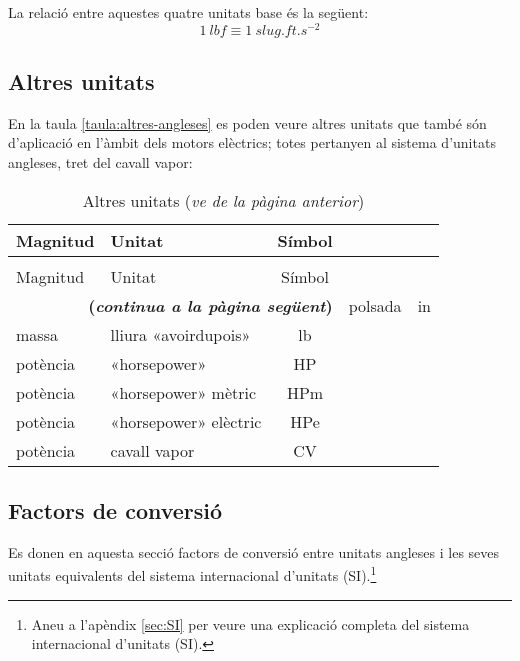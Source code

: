 La relació entre aquestes quatre unitats base és la següent:
\begin{equation}
    \SI{1}{lbf} \equiv \SI{1}{slug.ft.s^{-2}}
\end{equation}

\subsection{Altres unitats}

En la taula \vref{taula:altres-angleses} es poden veure altres unitats que també són d'aplicació en l'àmbit dels motors elèctrics; totes pertanyen al sistema d'unitats angleses, tret del cavall vapor:
\begin{longtable}[h]{llc}
   \caption{\label{taula:altres-angleses}Altres unitats}\\
   \toprule[1pt]
    Magnitud & Unitat & Símbol \\
   \midrule
   \endfirsthead
   \caption[]{Altres unitats (\emph{ve de la pàgina anterior})}\\
   \toprule[1pt]
    Magnitud & Unitat & Símbol \\
   \midrule
   \endhead
   \midrule
   \multicolumn{3}{r}{\sffamily\bfseries\color{NavyBlue}(\emph{continua a la pàgina següent})}
   \endfoot
   \endlastfoot
   longitud & polsada & in \\
   massa & lliura «avoirdupois» & lb \\
   potència & «horsepower» & HP \\
   potència & «horsepower» mètric & \si{HPm} \\
   potència & «horsepower» elèctric & \si{HPe} \\
   potència & cavall vapor & CV \\
   \bottomrule[1pt]
\end{longtable}


\subsection{Factors de conversió}

Es donen en aquesta secció factors de conversió entre unitats angleses i les seves unitats equivalents del sistema internacional d'unitats (SI).\footnote{Aneu a l'apèndix \ref{sec:SI} per veure una explicació completa del sistema internacional d'unitats (SI).}

